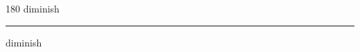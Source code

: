 
\begin{frame}
\begin{center}
\begin{turn}{180}
{\fontsize{2.5cm}{1em}\selectfont diminish}
\end{turn}
\vspace{1em}\par  
\hrule
\vspace{1em}\par  
{\fontsize{2.5cm}{1em}\selectfont diminish}
\end{center}
\end{frame}
